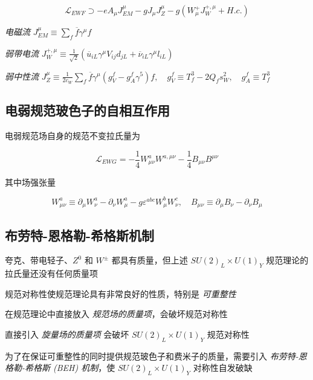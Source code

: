 \documentclass[oneside,a4paper,openany,11pt]{ctexbook}
\begin{document}
\begin{equation}
    \mathcal{L}_{EWF} \supset -e A_\mu J_{EM}^\mu - g J_\mu J_Z^\mu - g (W_\mu^ + J_W^{+, \mu} + H.c.)
\end{equation}

\emph{电磁流} $J_{EM}^\mu \equiv \sum_f \overline{f} \gamma^\mu f$

\emph{弱带电流} $J_{W}^{+, \mu} \equiv \frac{1}{\sqrt{2}}(\overline{u}_{iL} \gamma^\mu V_{ij} d_{jL} + \overline{\nu}_{iL} \gamma^\mu l_{iL})$

\emph{弱中性流} $J_{Z}^\mu \equiv \frac{1}{2 c_W} \sum_f \overline{f} \gamma^\mu (g_V^f-g_A^f \gamma^5)f, \quad g_V^f \equiv T_f^3 - 2 Q_f s_W^2, \quad g_A^f \equiv T_f^3$

\subsection{电弱规范玻色子的自相互作用}

电弱规范场自身的规范不变拉氏量为

\begin{equation}
    \mathcal{L}_{EWG} = -\frac{1}{4} W_{\mu\nu}^a W^{a, \mu\nu} - \frac{1}{4} B_{\mu\nu} B^{\mu\nu}
\end{equation}

其中场强张量

\begin{equation}
    W_{\mu\nu}^a \equiv \partial_\mu W_\nu^a - \partial_\nu W_\mu^a - g \varepsilon^{abc} W_\mu^b W_\nu^c, \quad B_{\mu\nu} \equiv \partial_\mu B_\nu - \partial_\nu B_\mu
\end{equation}

\subsection{布劳特-恩格勒-希格斯机制}

夸克、带电轻子、$Z^0$ 和 $W^\pm$ 都具有质量，但上述 $SU(2)_L \times U(1)_Y$ 规范理论的拉氏量还没有任何质量项

规范对称性使规范理论具有非常良好的性质，特别是 \emph{可重整性}

在规范理论中直接放入 \emph{规范场的质量项}，会破坏规范对称性

直接引入 \emph{旋量场的质量项} 会破坏 $SU(2)_L \times U(1)_Y$ 规范对称性

为了在保证可重整性的同时提供规范玻色子和费米子的质量，需要引入 \emph{布劳特-恩格勒-希格斯 (BEH) 机制}，使 $SU(2)_L \times U(1)_Y$ 对称性自发破缺
\end{document}
